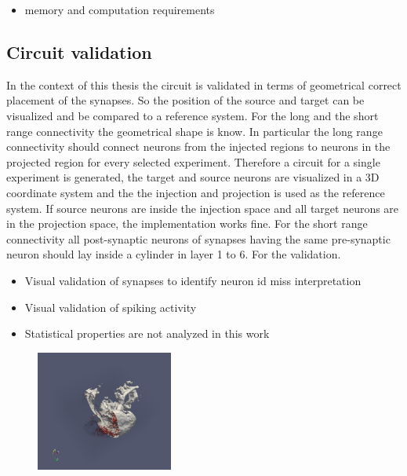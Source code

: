 \documentclass[a4paper]{article}
\begin{document}
\begin{itemize}
      \item memory and computation requirements
\end{itemize}




\newpage
\subsection{Circuit validation}

In the context of this thesis the circuit is validated in terms of geometrical correct placement of
the synapses. So the position of the source and target can be visualized and be compared to a 
reference system. For the long and the short range connectivity the geometrical shape is know.
In particular the long range connectivity should connect neurons from the injected regions to neurons
in the projected region for every selected experiment. Therefore a circuit for a single experiment is 
generated, the target and source neurons are visualized in a 3D coordinate system and the the injection
and projection is used as the reference system. If source neurons are inside the injection space and all
target neurons are in the projection space, the implementation works fine.
For the short range connectivity all post-synaptic neurons of synapses having the same pre-synaptic neuron should
lay inside a cylinder in layer 1 to 6. For the validation. 
 
\begin{itemize}
      \item Visual validation of synapses to identify neuron id miss interpretation
      \item Visual validation of spiking activity
      \item Statistical properties are not analyzed in this work 
\end{itemize}

\begin{figure}[ht!]
\centering
\includegraphics[width=0.4\textwidth]{paraview_ex.png}
\end{figure}
\end{document}
